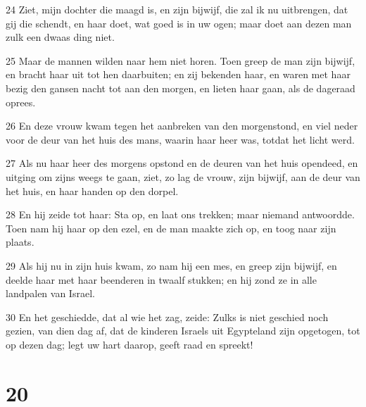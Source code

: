 \par 24 Ziet, mijn dochter die maagd is, en zijn bijwijf, die zal ik nu uitbrengen, dat gij die schendt, en haar doet, wat goed is in uw ogen; maar doet aan dezen man zulk een dwaas ding niet.
\par 25 Maar de mannen wilden naar hem niet horen. Toen greep de man zijn bijwijf, en bracht haar uit tot hen daarbuiten; en zij bekenden haar, en waren met haar bezig den gansen nacht tot aan den morgen, en lieten haar gaan, als de dageraad oprees.
\par 26 En deze vrouw kwam tegen het aanbreken van den morgenstond, en viel neder voor de deur van het huis des mans, waarin haar heer was, totdat het licht werd.
\par 27 Als nu haar heer des morgens opstond en de deuren van het huis opendeed, en uitging om zijns weegs te gaan, ziet, zo lag de vrouw, zijn bijwijf, aan de deur van het huis, en haar handen op den dorpel.
\par 28 En hij zeide tot haar: Sta op, en laat ons trekken; maar niemand antwoordde. Toen nam hij haar op den ezel, en de man maakte zich op, en toog naar zijn plaats.
\par 29 Als hij nu in zijn huis kwam, zo nam hij een mes, en greep zijn bijwijf, en deelde haar met haar beenderen in twaalf stukken; en hij zond ze in alle landpalen van Israel.
\par 30 En het geschiedde, dat al wie het zag, zeide: Zulks is niet geschied noch gezien, van dien dag af, dat de kinderen Israels uit Egypteland zijn opgetogen, tot op dezen dag; legt uw hart daarop, geeft raad en spreekt!

\chapter{20}

